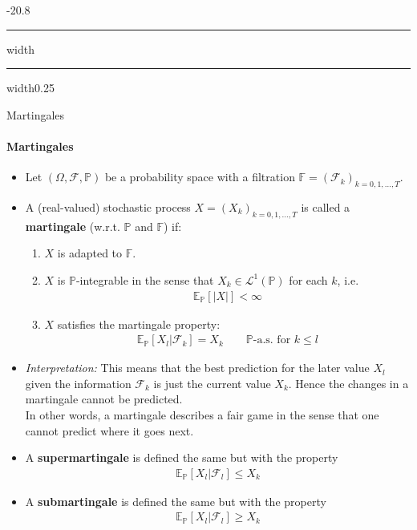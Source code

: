 \documentclass[a4paper,landscape,8pt,fleqn]{scrartcl}
\makeatletter
\renewcommand{\emph}[1]{\textbf{#1}}
\renewcommand{\subsection}{\@startsection{subsection}{1}{0mm}%
{-2\baselineskip}{0.8\baselineskip}%
{\hrule depth 0.2pt width\columnwidth\hrule depth0.75pt
width0.25\columnwidth\vspace*{1.2em}\large\bfseries}}
\makeatother
\begin{document}
\begin{multicols*}{3}
\subsection{Martingales}

\paragraph{Martingales}

\begin{itemize}
\item Let $(\Omega, \mathcal{F}, \mathbb{P})$ be a probability space with a filtration $\mathbb{F} = (\mathcal{F}_k)_{k=0,1, \ldots, T}$.
\item A (real-valued) stochastic process $X = (X_k)_{k=0,1, \ldots, T}$ is called a \emph{martingale} (w.r.t. $\mathbb{P}$ and $\mathbb{F}$) if:
\begin{enumerate}
\item $X$ is adapted to $\mathbb{F}$.
\item $X$ is $\mathbb{P}$-integrable in the sense that $X_k \in \mathcal{L}^1(\mathbb{P})$ for each $k$, i.e.
\begin{align*}
\mathbb{E}_\mathbb{P}[|X|] < \infty
\end{align*}
\item $X$ satisfies the martingale property:
\begin{align*}
\mathbb{E}_\mathbb{P} \left[ X_l | \mathcal{F}_k \right] = X_k \qquad \mathbb{P} \text{-a.s. for } k \leq l
\end{align*}
\end{enumerate}
\item \textit{Interpretation:} This means that the best prediction for the later value $X_l$ given the information $\mathcal{F}_k$ is just the current value $X_k$. Hence the changes in a martingale cannot be predicted. \\
In other words, a martingale describes a fair game in the sense that one cannot predict where it goes next.
\item A \emph{supermartingale} is defined the same but with the property
\begin{align*}
\mathbb{E}_\mathbb{P} [ X_l | \mathcal{F}_l] \leq X_k
\end{align*}
\item A \emph{submartingale} is defined the same but with the property
\begin{align*}
\mathbb{E}_\mathbb{P} [ X_l | \mathcal{F}_l] \geq X_k
\end{align*}
\end{itemize}


\end{multicols*}
\end{document}
